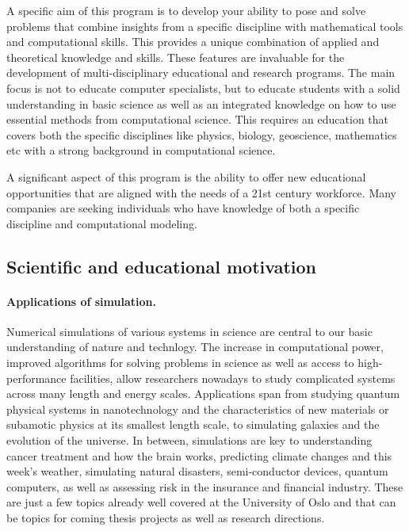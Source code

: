 \documentclass[%
oneside,                 %
final,                   %
10pt]{article}
\begin{document}
A specific aim of this program is to develop your ability to pose and
solve problems that combine  insights from a specific discipline with mathematical tools
and computational skills. This provides a unique combination
of applied and theoretical knowledge and skills. These features are invaluable
for the development of multi-disciplinary educational and research programs.
The main focus is not to educate computer
specialists, but to educate students with a solid understanding in basic science
as well as an integrated knowledge on how  to use
essential methods from computational science. This requires an
education that covers both the specific disciplines like physics, biology,
geoscience, mathematics etc with a strong background in computational science.

A significant aspect of this program is the ability to offer new educational
opportunities that are aligned with the needs of a 21st century
workforce. Many companies are seeking
individuals who have knowledge of both a specific discipline and
computational modeling.

\subsection*{Scientific and educational motivation}


\paragraph{Applications of simulation.}
Numerical simulations of various systems in science are central to our
basic understanding of nature and technlogy.
The increase in computational power,
improved algorithms for solving problems in science as well as access
to high-performance facilities, allow researchers nowadays to study
complicated systems across many length and energy scales. Applications
span from studying quantum physical systems in nanotechnology and the
characteristics of new materials or subamotic physics at its smallest
length scale, to simulating galaxies and the evolution of the universe.
In between, simulations are key to understanding
cancer treatment and how the brain works,
predicting climate changes and this week's weather,
simulating natural disasters, semi-conductor devices,
quantum computers, as well as assessing risk in the insurance and
financial industry. These are just a few topics
already well covered at the University of Oslo and that can be
topics for coming thesis projects as well as research directions.
\end{document}
